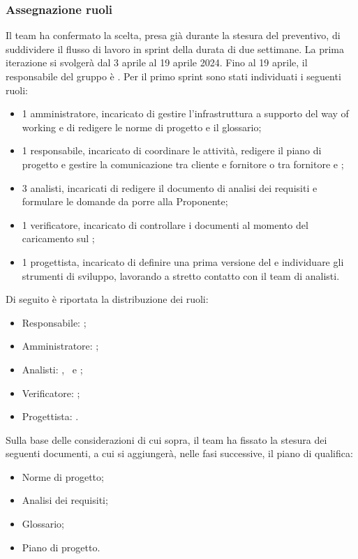 \subsubsection{Assegnazione ruoli}
Il team ha confermato la scelta, presa già durante la stesura del preventivo, di suddividere il flusso di lavoro in sprint della durata di due settimane. La prima iterazione si svolgerà dal 3 aprile al 19 aprile 2024. Fino al 19 aprile, il responsabile del gruppo è \riccardo. Per il primo sprint sono stati individuati i seguenti ruoli:
\begin{itemize}
	\item 1 amministratore, incaricato di gestire l'infrastruttura a supporto del way of working e di redigere le norme di progetto e il glossario;
	\item 1 responsabile, incaricato di coordinare le attività, redigere il piano di progetto e gestire la comunicazione tra cliente e fornitore o tra fornitore e ;
	\item 3 analisti, incaricati di redigere il documento di analisi dei requisiti e formulare le domande da porre alla Proponente;
	\item 1 verificatore, incaricato di controllare i documenti al momento del caricamento sul ;
	\item 1 progettista, incaricato di definire una prima versione del  e individuare gli strumenti di sviluppo, lavorando a stretto contatto con il team di analisti.
\end{itemize}

\vspace{0.5\baselineskip}
Di seguito è riportata la distribuzione dei ruoli:
\begin{itemize}
	\item Responsabile: \riccardo;
	\item Amministratore: \tommaso;
	\item Analisti: \marco, \martina \ e \sebastiano;
	\item Verificatore: \raul;
	\item Progettista: \mattia.
\end{itemize}

\vspace{0.5\baselineskip}
Sulla base delle considerazioni di cui sopra, il team ha fissato la stesura dei seguenti documenti, a cui si aggiungerà, nelle fasi successive, il piano di qualifica:
\begin{itemize}
	\item Norme di progetto;
	\item Analisi dei requisiti;
	\item Glossario;
	\item Piano di progetto.
\end{itemize}


